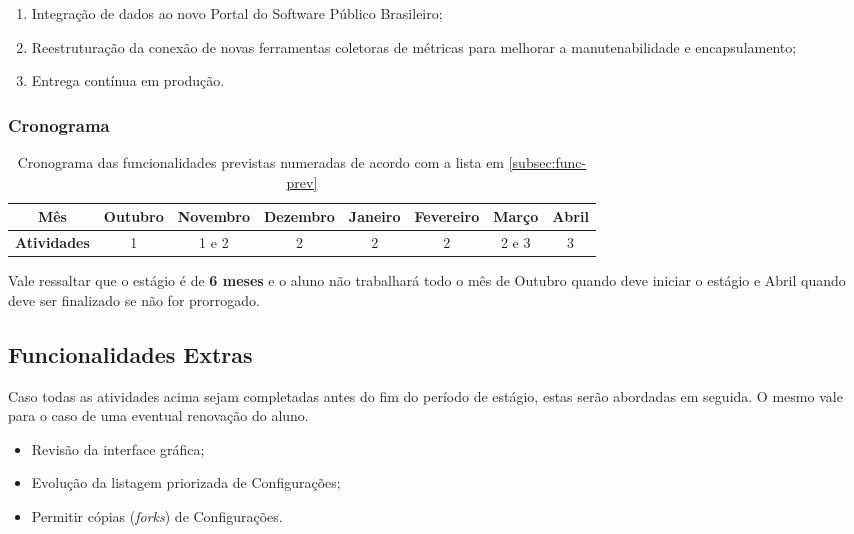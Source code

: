 \documentclass[12pt]{article}
\begin{document}
      \begin{enumerate}
        \item Integração de dados ao novo Portal do Software Público Brasileiro;
        \item Reestruturação da conexão de novas ferramentas coletoras de métricas para melhorar a manutenabilidade e encapsulamento;
        \item Entrega contínua em produção.
      \end{enumerate}

      \subsubsection{Cronograma}
        \begin{table}[H]
          \begin{tabu}{| c | c | c | c | c | c | c | c |}
            \hline
            \textbf{Mês} & Outubro & Novembro & Dezembro & Janeiro & Fevereiro & Março & Abril\\ \hline
            \textbf{Atividades} & 1 & 1 e 2 & 2 & 2 & 2 & 2 e 3 & 3\\ \hline
          \end{tabu}
          \caption{Cronograma das funcionalidades previstas numeradas de acordo com a lista em \ref{subsec:func-prev}}
        \end{table}

        Vale ressaltar que o estágio é de \textbf{6 meses} e o aluno não trabalhará todo o mês de Outubro quando deve iniciar o estágio e Abril quando deve ser finalizado se não for prorrogado.

    \subsection{Funcionalidades Extras}
      Caso todas as atividades acima sejam completadas antes do fim do período de estágio, estas serão abordadas em seguida. O mesmo vale para o caso de uma eventual renovação do aluno.

      \begin{itemize}
        \item Revisão da interface gráfica;
        \item Evolução da listagem priorizada de Configurações;
        \item Permitir cópias (\textit{forks}) de Configurações.
      \end{itemize}
\end{document}
